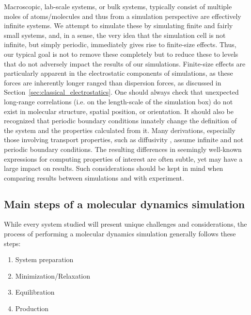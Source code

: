 \documentclass[9pt,bestpractices]{livecoms}
\begin{document}
Macroscopic, lab-scale systems, or bulk systems, typically consist of multiple moles of atoms/molecules and thus from a simulation perspective are effectively infinite systems.
We attempt to simulate these by simulating finite and fairly small systems, and, in a sense, the very idea that the simulation cell is not infinite, but simply periodic, immediately gives rise to finite-size effects.
Thus, our typical goal is not to remove these completely but to reduce these to levels that do not adversely impact the results of our simulations.
Finite-size effects are particularly apparent in the electrostatic components of simulations, as these forces are inherently longer ranged than dispersion forces, as discussed in Section~\ref{sec:classical_electrostatics}.
One should always check that unexpected long-range correlations (i.e. on the length-scale of the simulation box) do not exist in molecular structure, spatial position, or orientation.
It should also be recognized that periodic boundary conditions innately change the definition of the system and the properties calculated from it.
Many derivations, especially those involving transport properties, such as diffusivity \citep{Yeh2004}, assume infinite and not periodic boundary conditions. 
The resulting differences in seemingly well-known expressions for computing properties of interest are often subtle, yet may have a large impact on results.
Such considerations should be kept in mind when comparing results between simulations and with experiment.

\subsection{Main steps of a molecular dynamics simulation}
\label{sec:main_steps}
While every system studied will present unique challenges and considerations,
the process of performing a molecular dynamics simulation generally follows
these steps:

\begin{enumerate}
\item System preparation
\item Minimization/Relaxation
\item Equilibration
\item Production
\end{enumerate}
\end{document}
